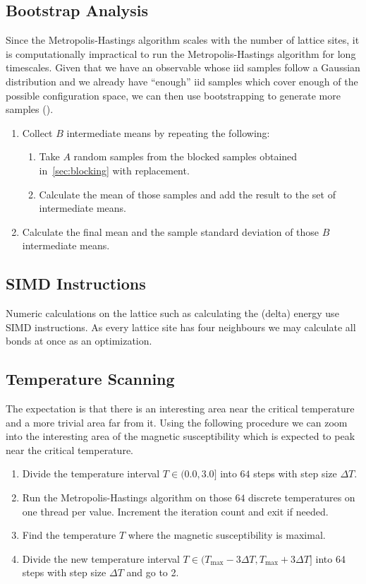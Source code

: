 \subsection{Bootstrap Analysis}\label{sec:bootstrap}
Since the Metropolis-Hastings algorithm scales with the number of lattice sites, it is computationally impractical to run the Metropolis-Hastings algorithm for long timescales. Given that we have an observable whose iid samples follow a Gaussian distribution and we already have \enquote{enough} iid samples which cover enough of the possible configuration space, we can then use bootstrapping to generate more samples (\citet{bootstrap}).
\begin{enumerate}
	\item Collect $B$ intermediate means by repeating the following:
	\begin{enumerate}
		\item Take $A$ random samples from the blocked samples obtained in~\cref{sec:blocking} with replacement.
		\item Calculate the mean of those samples and add the result to the set of intermediate means.
	\end{enumerate}
	\item Calculate the final mean and the sample standard deviation of those $B$ intermediate means.
\end{enumerate}

\subsection{SIMD Instructions}
Numeric calculations on the lattice such as calculating the (delta) energy use SIMD instructions. As every lattice site has four neighbours we may calculate all bonds at once as an optimization.

\subsection{Temperature Scanning}\label{sec:temperature_scanning}
The expectation is that there is an interesting area near the critical temperature and a more trivial area far from it. Using the following procedure we can zoom into the interesting area of the magnetic susceptibility which is expected to peak near the critical temperature.
\begin{enumerate}
	\item Divide the temperature interval $T \in (0.0, 3.0]$ into $64$ steps with step size $\Delta T$.
	\item Run the Metropolis-Hastings algorithm on those $64$ discrete temperatures on one thread per value. Increment the iteration count and exit if needed.
	\item Find the temperature $T$ where the magnetic susceptibility is maximal.
	\item Divide the new temperature interval $T \in (T_\text{max} - 3\Delta T, T_\text{max} + 3\Delta T]$ into $64$ steps with step size $\Delta T$ and go to 2.
\end{enumerate}



